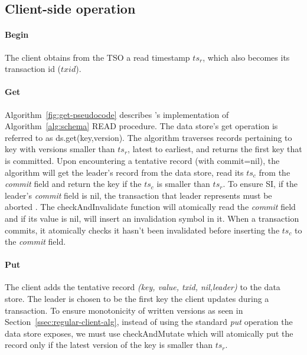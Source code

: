 \subsection{Client-side operation}
\label{ssec:client}

\paragraph{Begin}
The client obtains from the TSO a read timestamp $ts_r$, which also becomes its transaction id ($txid$).


\paragraph{Get}
Algorithm~\ref{fig:get-pseudocode} describes \sys's implementation of Algorithm~\ref{alg:schema} READ procedure.
The data store's get operation is referred to as ds.get(key,version). The algorithm traverses records pertaining
to key with versions smaller than $ts_r$, latest to earliest, and returns the first key that is committed. Upon
encountering a tentative record (with commit=nil), the algorithm will get the leader's record from the data store,
read its $ts_c$ from the \emph{commit} field and return the key if the $ts_c$ is smaller than $ts_r$. To ensure SI,
if the leader's \emph{commit} field is nil, the transaction that leader represents must be aborted . The checkAndInvalidate function will atomically read the \emph{commit} field and if its value is nil, will insert an invalidation symbol in it. When a transaction commits, it atomically checks it hasn't been invalidated before inserting the $ts_c$ to the \emph{commit} field.

\paragraph{Put}
The client adds the tentative record \emph{(key, value, txid, nil,leader)} to the data store.
The leader is chosen to be the first key the client updates during a transaction.
To ensure monotonicity of written versions as seen in Section~\ref{ssec:regular-client-alg}, instead of using the standard \emph{put} operation the data store exposes, we must use checkAndMutate which will atomically put the record only if the latest version of the key is smaller than $ts_r$.


